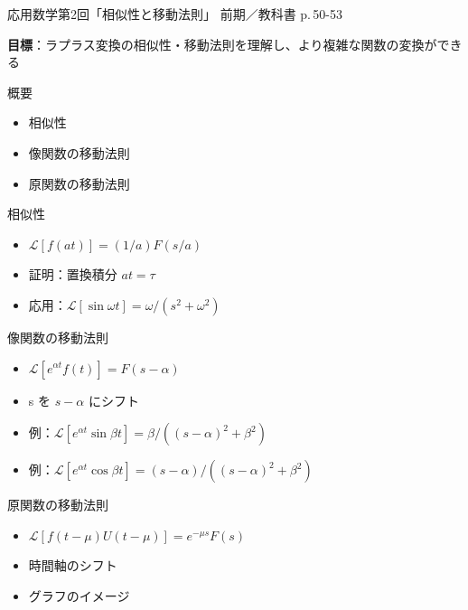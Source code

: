 \documentclass[aspectratio=43,professionalfonts,handout]{beamer}
\newcommand{\LectureNum}{2}
\newcommand{\LectureTitle}{相似性と移動法則}
\newcommand{\TextPages}{p.\,50-53}
\newcommand{\CourseName}{応用数学}
\renewcommand{\TermName}{前期}
\begin{document}
\begin{frame}{\CourseName\quad 第\LectureNum 回「\LectureTitle」}
  {\small \TermName\quad \TeacherName\quad ／\quad 教科書 \TextPages}

  \textbf{目標}：ラプラス変換の相似性・移動法則を理解し、より複雑な関数の変換ができる

  \begin{block}{概要}
  \begin{itemize}
    \item 相似性
    \item 像関数の移動法則
    \item 原関数の移動法則
  \end{itemize}
  \end{block}
\end{frame}

\begin{frame}{相似性}
  \begin{block}{}
  \begin{itemize}
    \item $\mathcal{L}[f(at)] = (1/a)F(s/a)$
    \item 証明：置換積分 $at=\tau$
    \item 応用：$\mathcal{L}[\sin \omega t] = \omega/(s^{2}+\omega^{2})$
  \end{itemize}
  \end{block}
\end{frame}

\begin{frame}{像関数の移動法則}
  \begin{block}{}
  \begin{itemize}
    \item $\mathcal{L}[e^{\alpha t}f(t)] = F(s-\alpha)$
    \item s を $s-\alpha$ にシフト
    \item 例：$\mathcal{L}[e^{\alpha t}\sin \beta t] = \beta/((s-\alpha)^{2}+\beta^{2})$
    \item 例：$\mathcal{L}[e^{\alpha t}\cos \beta t] = (s-\alpha)/((s-\alpha)^{2}+\beta^{2})$
  \end{itemize}
  \end{block}
\end{frame}

\begin{frame}{原関数の移動法則}
  \begin{block}{}
  \begin{itemize}
    \item $\mathcal{L}[f(t-\mu)U(t-\mu)] = e^{-\mu s}F(s)$
    \item 時間軸のシフト
    \item グラフのイメージ
  \end{itemize}
  \end{block}
\end{frame}
\end{document}
